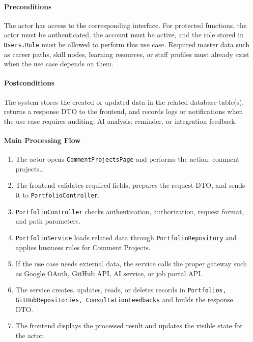 \paragraph{Preconditions}

The actor has access to the corresponding interface. For protected functions, the actor must be authenticated, the account must be active, and the role stored in \texttt{Users.Role} must be allowed to perform this use case. Required master data such as career paths, skill nodes, learning resources, or staff profiles must already exist when the use case depends on them.

\paragraph{Postconditions}

The system stores the created or updated data in the related database table(s), returns a response DTO to the frontend, and records logs or notifications when the use case requires auditing, AI analysis, reminder, or integration feedback.

\paragraph{Main Processing Flow}

\begin{enumerate}
    \item The actor opens \texttt{CommentProjectsPage} and performs the action: comment projects..
    \item The frontend validates required fields, prepares the request DTO, and sends it to \texttt{PortfolioController}.
    \item \texttt{PortfolioController} checks authentication, authorization, request format, and path parameters.
    \item \texttt{PortfolioService} loads related data through \texttt{PortfolioRepository} and applies business rules for Comment Projects.
    \item If the use case needs external data, the service calls the proper gateway such as Google OAuth, GitHub API, AI service, or job portal API.
    \item The service creates, updates, reads, or deletes records in \texttt{Portfolios, GitHubRepositories, ConsultationFeedbacks} and builds the response DTO.
    \item The frontend displays the processed result and updates the visible state for the actor.
\end{enumerate}

